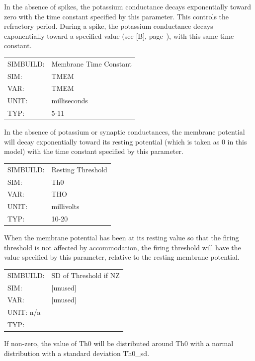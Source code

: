 \documentclass[12pt,openany,oneside]{book}
\newcommand{\tipxref}[1]{see [#1], page~\pageref{#1}}
\begin{document}
\noindent
In the absence of spikes, the potassium conductance decays
exponentially toward zero with the time constant specified by this
parameter. This controls the refractory period. During a spike, the
potassium conductance decays exponentially toward a specified value
(\tipxref{B}), with this same time constant.
\filbreak
\vspace{\baselineskip}

\label{TMEM}
\begin{flushleft}
\begin{tabular}{@{}ll@{}}
SIMBUILD: & Membrane Time Constant\\
SIM: & TMEM\\
VAR: & TMEM\\
UNIT: & milliseconds\\
TYP: & 5-11\\
\end{tabular}
\end{flushleft}
\noindent
In the absence of potassium or synaptic conductances, the membrane
potential will decay exponentially toward its resting potential (which
is taken as 0 in this model) with the time constant specified by this
parameter.
\filbreak
\vspace{\baselineskip}

\begin{flushleft}
\begin{tabular}{@{}ll@{}}
SIMBUILD: & Resting Threshold\\
SIM: & Th0\\
VAR: & THO\\
UNIT: & millivolts\\
TYP: & 10-20\\
\end{tabular}
\end{flushleft}
\noindent
When the membrane potential has been at its resting value so that the
firing threshold is not affected by accommodation, the firing
threshold will have the value specified by this parameter, relative to
the resting membrane potential.
\filbreak
\vspace{\baselineskip}

\begin{flushleft}
\begin{tabular}{@{}ll@{}}
SIMBUILD: & SD of Threshold if NZ\\
SIM: & [unused]\\
VAR: & [unused]\\
UNIT: n/a\\
TYP: &\\
\end{tabular}
\end{flushleft}
\noindent
If non-zero, the value of Th0 will be distributed
around Th0 with a normal distribution with a standard deviation Th0\_sd.
\filbreak
\vspace{\baselineskip}
\end{document}
